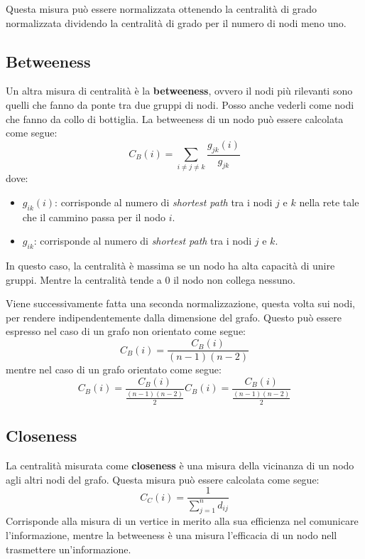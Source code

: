 Questa misura può essere normalizzata ottenendo la centralità di grado normalizzata
dividendo la centralità di grado per il numero di nodi meno uno.
\subsection{Betweeness}
Un altra misura di centralità è la \textbf{betweeness}, ovvero il nodi più
rilevanti sono quelli che fanno da ponte tra due gruppi di nodi. Posso anche
vederli come nodi che fanno da collo di bottiglia. La betweeness di un nodo
può essere calcolata come segue:
\begin{equation}
    C_B(i) = \sum_{i \neq j \neq k} \frac{g_{jk}(i)}{g_{jk}}
\end{equation}
dove:
\begin{itemize}
    \item $g_{ik}(i)$: corrisponde al numero di \textit{shortest path} tra i
          nodi $j$ e $k$ nella rete tale che il cammino passa per il nodo $i$.
    \item $g_{ik}$: corrisponde al numero di \textit{shortest path} tra i nodi
          $j$ e $k$.
\end{itemize}
In questo caso, la centralità è massima se un nodo ha alta capacità di unire
gruppi. Mentre la centralità tende a $0$ il nodo non collega nessuno.

Viene successivamente fatta una seconda normalizzazione, questa volta sui nodi,
per rendere indipendentemente dalla dimensione del grafo. Questo può essere
espresso nel caso di un grafo non orientato come segue:
\begin{equation}
    C_B(i) = \frac{C_B(i)}{(n - 1)(n - 2)}
\end{equation}
mentre nel caso di un grafo orientato come segue:
\begin{equation}
    C_B(i) = \frac{C_B(i)}{\frac{(n - 1)(n - 2)}{2}}
    C_B(i) = \frac{C_B(i)}{\frac{(n - 1)(n - 2)}{2}}
\end{equation}
\subsection{Closeness}
La centralità misurata come \textbf{closeness} è una misura della vicinanza di
un nodo agli altri nodi del grafo. Questa misura può essere calcolata come segue:
\begin{equation}
    C_C(i) = \frac{1}{\sum_{j=1}^{n} d_{ij}}
\end{equation}
Corrisponde alla misura di un vertice in merito alla sua efficienza nel
comunicare l'informazione, mentre la betweeness è una misura l'efficacia di un
nodo nell trasmettere un'informazione.


